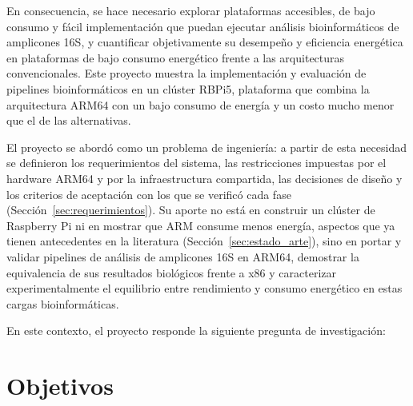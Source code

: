 \documentclass[12pt,oneside,spanish]{book}
\begin{document}
    En consecuencia, se hace necesario explorar plataformas accesibles, de bajo consumo y fácil implementación que puedan ejecutar análisis bioinformáticos de amplicones 16S, y cuantificar objetivamente su desempeño y eficiencia energética en plataformas de bajo consumo energético frente a las arquitecturas convencionales. Este proyecto muestra la implementación y evaluación de pipelines bioinformáticos en un clúster RBPi5, plataforma que combina la arquitectura ARM64 con un bajo consumo de energía y un costo mucho menor que el de las alternativas.

    El proyecto se abordó como un problema de ingeniería: a partir de esta necesidad se definieron los requerimientos del sistema, las restricciones impuestas por el hardware ARM64 y por la infraestructura compartida, las decisiones de diseño y los criterios de aceptación con los que se verificó cada fase (Sección~\ref{sec:requerimientos}). Su aporte no está en construir un clúster de Raspberry Pi ni en mostrar que ARM consume menos energía, aspectos que ya tienen antecedentes en la literatura (Sección~\ref{sec:estado_arte}), sino en portar y validar pipelines de análisis de amplicones 16S en ARM64, demostrar la equivalencia de sus resultados biológicos frente a x86 y caracterizar experimentalmente el equilibrio entre rendimiento y consumo energético en estas cargas bioinformáticas.
    
    En este contexto, el proyecto responde la siguiente pregunta de investigación:
    
    \vspace{0.5cm}
    
    \noindent{}
    
    \vspace{0.5cm}
    
    
    \section*{Objetivos}
    
\end{document}
